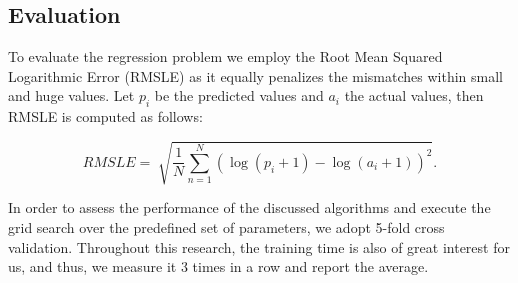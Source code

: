 \subsection{Evaluation}

To evaluate the regression problem we employ the Root Mean Squared Logarithmic Error (RMSLE) as it equally penalizes the mismatches within small and huge values. Let $p_i$ be the predicted values and $a_i$ the actual values, then RMSLE is computed as follows:

$$ RMSLE = \sqrt[]{\frac{1}{N}\sum_{n = 1}^N (\log(p_i + 1) - \log(a_i + 1))^2}. $$

In order to assess the performance of the discussed algorithms and execute the grid search over the predefined set of parameters, we adopt 5-fold cross validation. Throughout this research, the training time is also of great interest for us, and thus, we measure it 3 times in a row and report the average.



